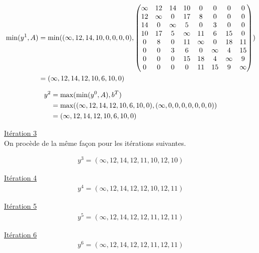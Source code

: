 \documentclass{article}
\begin{document}
\begin{align*}
  \operatorname{min}(y^1,A) &= \operatorname{min}((\infty,12,14,10,0,0,0,0),
  \begin{pmatrix}
      \infty & 12 & 14 & 10 & 0 & 0 & 0 & 0 \\
      12 & \infty & 0 & 17 & 8 & 0 & 0 & 0 \\
      14 & 0 & \infty & 5 & 0 & 3 & 0 & 0 \\
      10 & 17 & 5 & \infty & 11 & 6 & 15 & 0 \\
      0 & 8 & 0 & 11 & \infty & 0 & 18 & 11 \\
      0 & 0 & 3 & 6 & 0 & \infty & 4 & 15 \\
      0 & 0 & 0 & 15 & 18 & 4 & \infty & 9 \\
      0 & 0 & 0 & 0 & 11 & 15 & 9 & \infty
  \end{pmatrix})\\
  &= (\infty, 12,14,12,10,6,10,0)
\end{align*}

\begin{align*}
  y^2 &= \operatorname{max}(\operatorname{min}(y^0,A),b^T)\\
  &= \operatorname{max}((\infty, 12,14,12,10,6,10,0), (\infty,0,0,0,0,0,0,0))\\
  &= (\infty, 12,14,12,10,6,10,0)
\end{align*}

\underline{Itération 3}\\

On procède de la même façon pour les itérations suivantes.

\begin{align*}
  y^3 = (\infty,12,14,12,11,10,12,10)
\end{align*}

\underline{Itération 4}\\

\begin{align*}
  y^4 = (\infty,12,14,12,12,10,12,11)
\end{align*}

\underline{Itération 5}\\

\begin{align*}
  y^5 = (\infty,12,14,12,12,11,12,11)
\end{align*}

\underline{Itération 6}\\

\begin{align*}
  y^6 = (\infty,12,14,12,12,11,12,11)
\end{align*}\\
\end{document}
